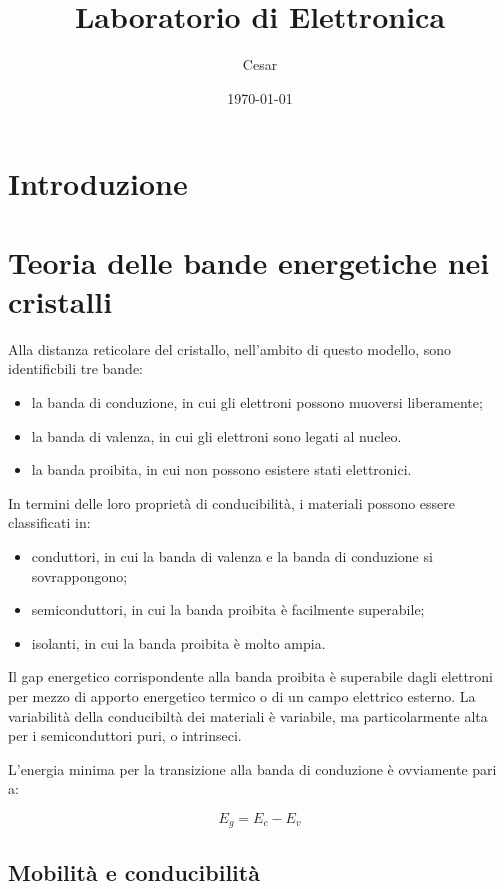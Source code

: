 \documentclass{article}
\title{Laboratorio di Elettronica}
\author{Cesar}
\date{\today}
\begin{document}
\maketitle

\section{Introduzione}

\section{Teoria delle bande energetiche nei cristalli}
Alla distanza reticolare del cristallo, nell'ambito di questo modello, sono identificbili tre bande:
\begin{itemize}
    \item la banda di conduzione, in cui gli elettroni possono muoversi liberamente;
    \item la banda di valenza, in cui gli elettroni sono legati al nucleo.
    \item la banda proibita, in cui non possono esistere stati elettronici.
\end{itemize}

In termini delle loro proprietà di conducibilità, i materiali possono essere classificati in:
\begin{itemize}
    \item conduttori, in cui la banda di valenza e la banda di conduzione si sovrappongono;
    \item semiconduttori, in cui la banda proibita è facilmente superabile;
    \item isolanti, in cui la banda proibita è molto ampia.
\end{itemize}

Il gap energetico corrispondente alla banda proibita è superabile dagli elettroni per mezzo di apporto energetico termico o di un campo elettrico esterno.
La variabilità della conducibiltà dei materiali è variabile, ma particolarmente alta per i semiconduttori puri, o intrinseci.

L'energia minima per la transizione alla banda di conduzione è ovviamente pari a:

\begin{equation}
    E_g = E_c - E_v
\end{equation}

\subsection*{Mobilità e conducibilità}
\end{document}
